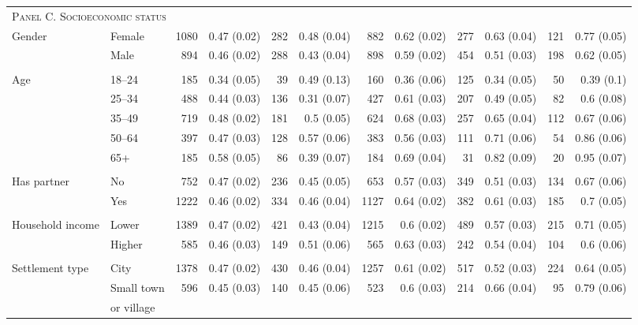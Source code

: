 \begin{tabular}{p{1.3in}p{1.1in}rrrrrrrrrr}
	 \midrule
	\multicolumn{12}{l}{\textsc{Panel C. Socioeconomic status}} \\
Gender & Female & 1080 & 0.47 (0.02) & 282 & 0.48 (0.04) & 882 & 0.62 (0.02) & 277 & 0.63 (0.04) & 121 & 0.77 (0.05) \\ 
& Male & 894 & 0.46 (0.02) & 288 & 0.43 (0.04) & 898 & 0.59 (0.02) & 454 & 0.51 (0.03) & 198 & 0.62 (0.05) \\ 
	\vspace{1pt}\\
Age & 18--24 & 185 & 0.34 (0.05) & 39 & 0.49 (0.13) & 160 & 0.36 (0.06) & 125 & 0.34 (0.05) & 50 & 0.39 (0.1) \\ 
& 25--34 & 488 & 0.44 (0.03) & 136 & 0.31 (0.07) & 427 & 0.61 (0.03) & 207 & 0.49 (0.05) & 82 & 0.6 (0.08) \\ 
& 35--49 & 719 & 0.48 (0.02) & 181 & 0.5 (0.05) & 624 & 0.68 (0.03) & 257 & 0.65 (0.04) & 112 & 0.67 (0.06) \\ 
& 50--64 & 397 & 0.47 (0.03) & 128 & 0.57 (0.06) & 383 & 0.56 (0.03) & 111 & 0.71 (0.06) & 54 & 0.86 (0.06) \\ 
& 65+ & 185 & 0.58 (0.05) & 86 & 0.39 (0.07) & 184 & 0.69 (0.04) & 31 & 0.82 (0.09) & 20 & 0.95 (0.07) \\ 
	\vspace{1pt}\\
Has partner & No & 752 & 0.47 (0.02) & 236 & 0.45 (0.05) & 653 & 0.57 (0.03) & 349 & 0.51 (0.03) & 134 & 0.67 (0.06) \\ 
& Yes & 1222 & 0.46 (0.02) & 334 & 0.46 (0.04) & 1127 & 0.64 (0.02) & 382 & 0.61 (0.03) & 185 & 0.7 (0.05) \\ 
	\vspace{1pt}\\
Household income & Lower & 1389 & 0.47 (0.02) & 421 & 0.43 (0.04) & 1215 & 0.6 (0.02) & 489 & 0.57 (0.03) & 215 & 0.71 (0.05) \\ 
& Higher & 585 & 0.46 (0.03) & 149 & 0.51 (0.06) & 565 & 0.63 (0.03) & 242 & 0.54 (0.04) & 104 & 0.6 (0.06) \\ 
	\vspace{1pt}\\
Settlement type & City & 1378 & 0.47 (0.02) & 430 & 0.46 (0.04) & 1257 & 0.61 (0.02) & 517 & 0.52 (0.03) & 224 & 0.64 (0.05) \\ 
& Small town & 596 & 0.45 (0.03) & 140 & 0.45 (0.06) & 523 & 0.6 (0.03) & 214 & 0.66 (0.04) & 95 & 0.79 (0.06) \\ 
 & or village \\

\end{tabular}

